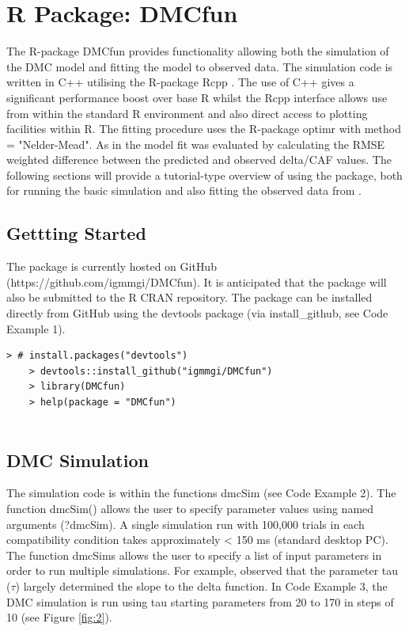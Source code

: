 \section{R Package: DMCfun} 
The R-package DMCfun provides functionality allowing both the simulation of the
DMC model and fitting the model to observed data. The simulation code is
written in C++ utilising the R-package Rcpp \parencite{eddelbuettel2011rcpp}.
The use of C++ gives a significant performance boost over base R whilst the
Rcpp interface allows \DIFdelbegin {}\DIFdelend \DIFaddbegin {}\DIFaddend use from within the standard R environment
and also direct access to plotting facilities within R. The fitting procedure
uses the R-package optimr \textcite{optimr} with method = "Nelder-Mead". As in
\textcite{ulrich2015automatic} the model fit was evaluated by calculating the
RMSE weighted difference between the predicted and observed delta/CAF values.
The following sections will provide a tutorial-type overview of using the
package, both for running the basic simulation and also fitting the observed
data from \textcite{ulrich2015automatic}.

\label{dmc_fun}
\subsection{Gettting Started}
\label{getting_started}
The package is currently hosted on GitHub (https://github.com/igmmgi/DMCfun).
It is anticipated that the package will also be submitted to the R CRAN
repository. The package can be installed directly from GitHub using the
devtools package (via install\_github, see Code Example 1).

\begin{minipage}{\linewidth}
    \begin{lstlisting}[style = R, title={R Code Example 1: instalation}, captionpos=t]
    > # install.packages("devtools")
    > devtools::install_github("igmmgi/DMCfun")
    > library(DMCfun)
    > help(package = "DMCfun")  
    
\end{lstlisting}
\end{minipage}

\subsection{DMC Simulation}
\label{dmc_simulation}
The simulation code is within the functions dmcSim (see Code Example 2).  The
function dmcSim() allows the user to specify parameter values using named
arguments (?dmcSim). A single simulation run with 100,000 trials in each
compatibility condition takes approximately < 150 ms (standard desktop PC).
The function dmcSims allows the user to specify a list of input parameters in
order to run multiple simulations. For example, \textcite{ulrich2015automatic}
observed that the parameter tau ($\tau$) largely determined the slope to the
delta function. In Code Example 3, the DMC simulation is run using tau starting
parameters from 20 to 170 in steps of 10 (see Figure \ref{fig:2}).

